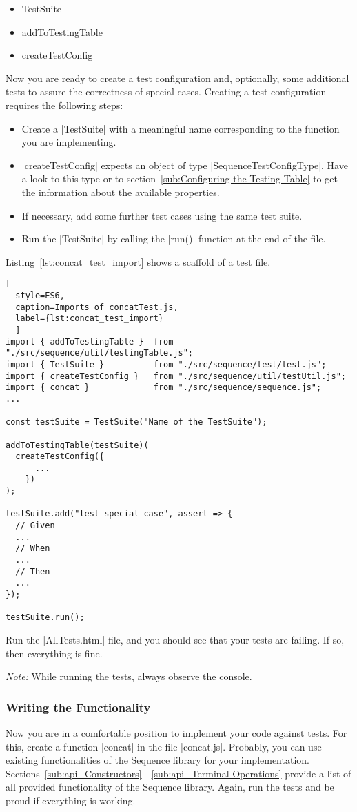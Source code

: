 \begin{itemize}
  \item{TestSuite}
  \item{addToTestingTable}
  \item{createTestConfig}
\end{itemize}
Now you are ready to create a test configuration and, optionally, some
additional tests to assure the correctness of special cases. Creating a test
configuration requires the following steps:

\begin{itemize}
  \item{Create a |TestSuite| with a meaningful name corresponding to the function you are implementing.}
  \item{|createTestConfig| expects an object of type |SequenceTestConfigType|. Have a look
    to this type or to section~\ref{sub:Configuring the Testing Table} to get the information about the available properties. }
      \item{If necessary, add some further test cases using the same test suite.}
  \item{Run the |TestSuite| by calling the |run()| function at the end of the file. }
\end{itemize}

Listing~\ref{lst:concat_test_import} shows a scaffold of a test file. 

\begin{lstlisting}[
  style=ES6, 
  caption=Imports of concatTest.js,
  label={lst:concat_test_import}
  ]
import { addToTestingTable }  from "./src/sequence/util/testingTable.js";
import { TestSuite }          from "./src/sequence/test/test.js";
import { createTestConfig }   from "./src/sequence/util/testUtil.js";
import { concat }             from "./src/sequence/sequence.js";
...

const testSuite = TestSuite("Name of the TestSuite");

addToTestingTable(testSuite)(
  createTestConfig({
      ...
    })
);

testSuite.add("test special case", assert => {
  // Given
  ...
  // When
  ...
  // Then
  ...
});

testSuite.run();
\end{lstlisting}

Run the |AllTests.html| file, and you should see that your tests are failing.
If so, then everything is fine.

\textit{Note:} While running the tests, always observe the console.

\subsubsection{Writing the Functionality}
\label{subsub:Write the Functionality}
Now you are in a comfortable position to implement your code against tests.
For this, create a function |concat| in the file |concat.js|.
Probably, you can use existing functionalities of the Sequence library for your
implementation. Sections~\ref{sub:api_Constructors} - \ref{sub:api_Terminal
Operations} provide a list of all provided functionality of the Sequence
library.
\newline
Again, run the tests and be proud if everything is working.
